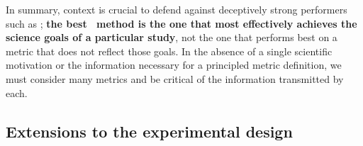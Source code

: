 In summary, context is crucial to defend against deceptively strong performers such as \trainz; \textbf{the best \pzpdf\ method is the one that most effectively achieves the science goals of a particular study}, not the one that performs best on a metric that does not reflect those goals.
In the absence of a single scientific motivation or the information necessary for a principled metric definition, we must consider many metrics and be critical of the information transmitted by each.

\subsection{Extensions to the experimental design}

